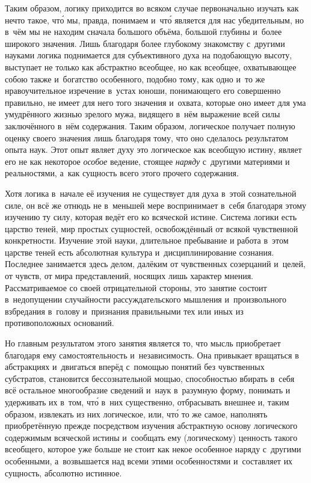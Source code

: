Таким образом, логику приходится во всяком случае первоначально изучать как
нечто такое, чт\'{о} мы, правда, понимаем и~чт\'{о} является для нас
убедительным,
но в~чём мы не находим сначала большого объёма, большой глубины и~более
широкого значения. Лишь благодаря более глубокому знакомству с~другими
науками логика поднимается для субъективного духа на подобающую высоту,
выступает не только как абстрактно всеобщее, но как всеобщее, охватывающее
собою также и~богатство особенного, подобно тому, как одно и~то же
нравоучительное изречение в~устах юноши, понимающего его совершенно
правильно, не имеет для него того значения и~охвата, которые оно имеет для
ума умудрённого жизнью зрелого мужа, видящего в~нём выражение всей силы
заключённого в~нём содержания. Таким образом, логическое получает полную
оценку своего значения лишь благодаря тому, что оно сделалось результатом
опыта наук. Этот опыт являет духу это логическое как всеобщую истину,
являет его не как некоторое {\em особое} ведение,
стоящее {\em наряду} с~другими материями и
реальностями, а~как сущность всего этого прочего содержания.

Хотя логика в~начале её изучения не существует для духа в~этой сознательной
силе, он всё же отнюдь не в~меньшей мере воспринимает в~себя благодаря
этому изучению ту силу, которая ведёт его ко всяческой истине. Система
логики есть царство теней, мир простых сущностей, освобождённый от всякой
чувственной конкретности. Изучение этой науки, длительное пребывание и
работа в~этом царстве теней есть абсолютная культура и~дисциплинирование
сознания. Последнее занимается здесь делом, далёким от чувственных
созерцаний и~целей, от чувств, от мира представлений, носящих лишь характер
мнения. Рассматриваемое со своей отрицательной стороны, это занятие состоит
в~недопущении случайности рассуждательского мышления и~произвольного
взбредания в~голову и~признания правильными тех или иных из
противоположных оснований.

Но главным результатом этого занятия является то, что мысль приобретает
благодаря ему самостоятельность и~независимость. Она привыкает вращаться в
абстракциях и~двигаться вперёд с~помощью понятий без чувственных
субстратов, становится бессознательной мощью, способностью вбирать в~себя
всё остальное многообразие сведений и~наук в~разумную форму, понимать и
удерживать их в~том, чт\'{о} в~них существенно, отбрасывать внешнее и, таким
образом, извлекать из них логическое, или, чт\'{о} то же самое, наполнять
приобретённую прежде посредством изучения абстрактную основу логического
содержимым всяческой истины и~сообщать ему (логическому) ценность такого
всеобщего, которое уже больше не стоит как некое особенное наряду с~другими
особенными, а~возвышается над всеми этими особенностями и~составляет их
сущность, абсолютно истинное.

